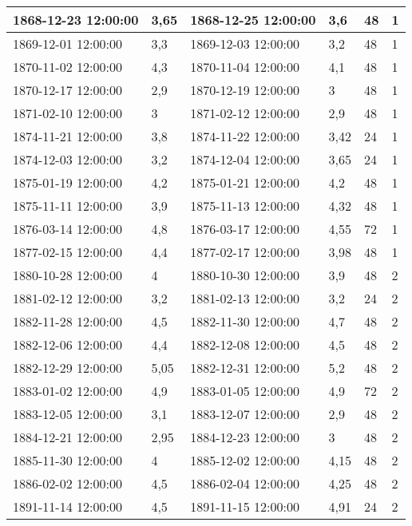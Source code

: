 \documentclass[11pt]{article}
\begin{document}
\begin{longtable}{|l|p{2.3cm}|l|p{2.3cm}|l|l|}
        1868-12-23 12:00:00 & 3,65 & 1868-12-25 12:00:00 & 3,6 & 48 & 1 \\ \hline
        1869-12-01 12:00:00 & 3,3 & 1869-12-03 12:00:00 & 3,2 & 48 & 1 \\ \hline
        1870-11-02 12:00:00 & 4,3 & 1870-11-04 12:00:00 & 4,1 & 48 & 1 \\ \hline
        1870-12-17 12:00:00 & 2,9 & 1870-12-19 12:00:00 & 3 & 48 & 1 \\ \hline
        1871-02-10 12:00:00 & 3 & 1871-02-12 12:00:00 & 2,9 & 48 & 1 \\ \hline
        1874-11-21 12:00:00 & 3,8 & 1874-11-22 12:00:00 & 3,42 & 24 & 1 \\ \hline
        1874-12-03 12:00:00 & 3,2 & 1874-12-04 12:00:00 & 3,65 & 24 & 1 \\ \hline
        1875-01-19 12:00:00 & 4,2 & 1875-01-21 12:00:00 & 4,2 & 48 & 1 \\ \hline
        1875-11-11 12:00:00 & 3,9 & 1875-11-13 12:00:00 & 4,32 & 48 & 1 \\ \hline
        1876-03-14 12:00:00 & 4,8 & 1876-03-17 12:00:00 & 4,55 & 72 & 1 \\ \hline
        1877-02-15 12:00:00 & 4,4 & 1877-02-17 12:00:00 & 3,98 & 48 & 1 \\ \hline
        1880-10-28 12:00:00 & 4 & 1880-10-30 12:00:00 & 3,9 & 48 & 2 \\ \hline
        1881-02-12 12:00:00 & 3,2 & 1881-02-13 12:00:00 & 3,2 & 24 & 2 \\ \hline
        1882-11-28 12:00:00 & 4,5 & 1882-11-30 12:00:00 & 4,7 & 48 & 2 \\ \hline
        1882-12-06 12:00:00 & 4,4 & 1882-12-08 12:00:00 & 4,5 & 48 & 2 \\ \hline
        1882-12-29 12:00:00 & 5,05 & 1882-12-31 12:00:00 & 5,2 & 48 & 2 \\ \hline
        1883-01-02 12:00:00 & 4,9 & 1883-01-05 12:00:00 & 4,9 & 72 & 2 \\ \hline
        1883-12-05 12:00:00 & 3,1 & 1883-12-07 12:00:00 & 2,9 & 48 & 2 \\ \hline
        1884-12-21 12:00:00 & 2,95 & 1884-12-23 12:00:00 & 3 & 48 & 2 \\ \hline
        1885-11-30 12:00:00 & 4 & 1885-12-02 12:00:00 & 4,15 & 48 & 2 \\ \hline
        1886-02-02 12:00:00 & 4,5 & 1886-02-04 12:00:00 & 4,25 & 48 & 2 \\ \hline
        1891-11-14 12:00:00 & 4,5 & 1891-11-15 12:00:00 & 4,91 & 24 & 2 \\ \hline

\end{longtable}
\end{document}

